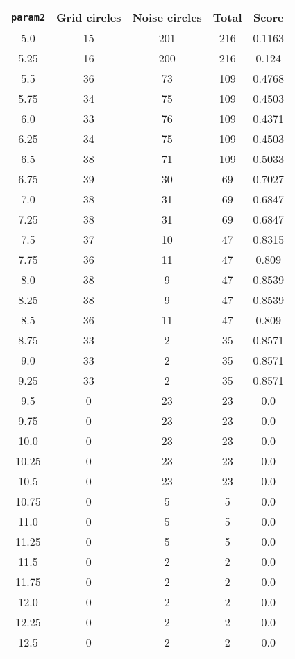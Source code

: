 \documentclass[letterpaper, 12pt]{article}
\begin{document}
\begin{longtable}{|c|c|c|c|c|}
\hline
\textbf{\texttt{param2}} & \textbf{Grid circles} & \textbf{Noise circles} & \textbf{Total} & \textbf{Score} \\
\hline
5.0 & 15 & 201 & 216 & 0.1163 \\
\hline
5.25 & 16 & 200 & 216 & 0.124 \\
\hline
5.5 & 36 & 73 & 109 & 0.4768 \\
\hline
5.75 & 34 & 75 & 109 & 0.4503 \\
\hline
6.0 & 33 & 76 & 109 & 0.4371 \\
\hline
6.25 & 34 & 75 & 109 & 0.4503 \\
\hline
6.5 & 38 & 71 & 109 & 0.5033 \\
\hline
6.75 & 39 & 30 & 69 & 0.7027 \\
\hline
7.0 & 38 & 31 & 69 & 0.6847 \\
\hline
7.25 & 38 & 31 & 69 & 0.6847 \\
\hline
7.5 & 37 & 10 & 47 & 0.8315 \\
\hline
7.75 & 36 & 11 & 47 & 0.809 \\
\hline
8.0 & 38 & 9 & 47 & 0.8539 \\
\hline
8.25 & 38 & 9 & 47 & 0.8539 \\
\hline
8.5 & 36 & 11 & 47 & 0.809 \\
\hline
8.75 & 33 & 2 & 35 & 0.8571 \\
\hline
9.0 & 33 & 2 & 35 & 0.8571 \\
\hline
9.25 & 33 & 2 & 35 & 0.8571 \\
\hline
9.5 & 0 & 23 & 23 & 0.0 \\
\hline
9.75 & 0 & 23 & 23 & 0.0 \\
\hline
10.0 & 0 & 23 & 23 & 0.0 \\
\hline
10.25 & 0 & 23 & 23 & 0.0 \\
\hline
10.5 & 0 & 23 & 23 & 0.0 \\
\hline
10.75 & 0 & 5 & 5 & 0.0 \\
\hline
11.0 & 0 & 5 & 5 & 0.0 \\
\hline
11.25 & 0 & 5 & 5 & 0.0 \\
\hline
11.5 & 0 & 2 & 2 & 0.0 \\
\hline
11.75 & 0 & 2 & 2 & 0.0 \\
\hline
12.0 & 0 & 2 & 2 & 0.0 \\
\hline
12.25 & 0 & 2 & 2 & 0.0 \\
\hline
12.5 & 0 & 2 & 2 & 0.0 \\

\end{longtable}
\end{document}
